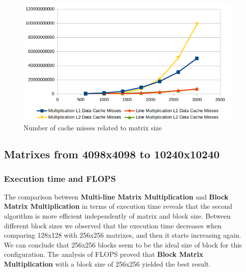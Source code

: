 \begin{figure}[H]
    \centering
    \includegraphics[width=.8\linewidth]{img/small_cache.png}
    \caption{Number of cache misses related to matrix size}
\end{figure}

\subsection{Matrixes from 4098x4098 to 10240x10240}

\subsubsection{Execution time and \uppercase{FLOPS}}

The comparison between \textbf{Multi-line Matrix Multiplication} and \textbf{Block Matrix Multiplication} in terms of execution time reveals that the second algorithm is more efficient independently of matrix and block size. Between different block sizes we observed that the execution time decreases when comparing 128x128 with 256x256 matrixes, and then it starts increasing again. We can conclude that 256x256 blocks seem to be the ideal size of block for this configuration. The analysis of \uppercase{FLOPS} proved that \textbf{Block Matrix Multiplication} with a block size of 256x256 yielded the best result.


